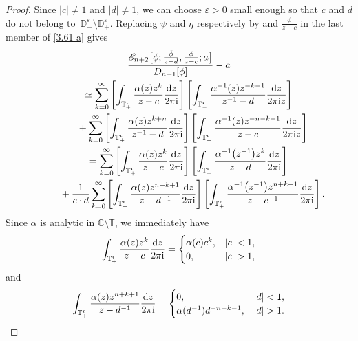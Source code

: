 \documentclass[10pt,a4paper]{amsart}
\numberwithin{equation}{section}
\newcommand{\C}{{\mathbb C}}
\newcommand{\D}{{\mathbb D}}
\newcommand{\T}{{\mathbb T}}
\newcommand{\al}{\alpha}
\newcommand{\ep}{\varepsilon}
\newcommand{\di}{\displaystyle}
\newcommand{\ii}{{\rm i}}
\newcommand{\dd}{{\rm d}}
\begin{document}
\begin{proof}
			Since $|c| \neq 1$ and $|d| \neq 1$, we can choose $\varepsilon>0$ small enough so that $c$ and $d$ do not belong to~$\D^{\ep}_- \setminus \overline{\D^{\ep}_+}$. Replacing $\psi$ and $\eta$ respectively by  and $\frac{\phi}{z-c}$ in the last member of \eqref{3.61 a} gives
			\begin{gather}
					\frac{\mathscr{E}_{n+2}\big[\phi;\di \tfrac{\tilde{\phi}}{z-d}, \tfrac{\phi}{z-c} ;a\big]}{D_{n+1}[\phi]} - a\nonumber\\
\qquad\simeq \sum_{k=0}^{\infty} \left[ \int_{\T^{\mathfrak{r}}_{+}} \frac{\al(z) z^k}{z-c} \frac{\dd z}{2 \pi \ii} \right] \left[ \int_{\T^{\mathfrak{r}}_{-}} \frac{\al^{-1}(z) z^{-k-1}}{z^{-1}-d} \frac{\dd z}{2 \pi \ii z} \right] \nonumber\\
\phantom{\qquad\simeq}{}+ \sum_{k=0}^{\infty} \left[ \int_{\T^{\mathfrak{r}}_{+}} \frac{\al(z) z^{k+n}}{z^{-1}-d} \frac{\dd z}{2 \pi \ii} \right] \left[ \int_{\T^{\mathfrak{r}}_{-}} \frac{\al^{-1}(z) z^{-n-k-1}}{z-c} \frac{\dd z}{2 \pi \ii z} \right] \nonumber\\
\qquad= \sum_{k=0}^{\infty} \left[ \int_{\T^{\mathfrak{r}}_{+}} \frac{\al(z) z^k}{z-c} \frac{\dd z}{2 \pi \ii} \right] \left[ \int_{\T^{\mathfrak{r}}_{+}} \frac{\al^{-1}\big(z^{-1}\big) z^{k}}{z-d} \frac{\dd z}{2 \pi \ii} \right]\nonumber\\
\phantom{\qquad\simeq}{}+ \frac{1}{c\cdot d} \sum_{k=0}^{\infty} \left[
					\int_{\T^{\mathfrak{r}}_{+}} \frac{\al(z) z^{n+k+1}}{z-d^{-1}} \frac{\dd z}{2 \pi \ii} \right] \left[ \int_{\T^{\mathfrak{r}}_{+}} \frac{\al^{-1}\big(z^{-1}\big) z^{n+k+1}}{z-c^{-1}} \frac{\dd z}{2 \pi \ii} \right].\label{3.63 a}
			\end{gather}
			Since $\al$ is analytic in $\C \setminus \T$, we immediately have
			\begin{equation*}
				\int_{\T^{\mathfrak{r}}_{+}} \frac{\al(z) z^k}{z-c} \frac{\dd z}{2 \pi \ii} = \begin{cases}
					\al(c)c^k, & |c|<1, \\
					0, & |c|>1,
				\end{cases}
			\end{equation*} and
			\begin{equation*}
				\int_{\T^{\mathfrak{r}}_{+}} \frac{\al(z) z^{n+k+1}}{z-d^{-1}} \frac{\dd z}{2 \pi \ii} = \begin{cases}
					0, & |d|<1, \\
					\al(d^{-1}) d^{-n-k-1}, & |d|>1.
				\end{cases}
			\end{equation*}

\end{proof}
\end{document}
